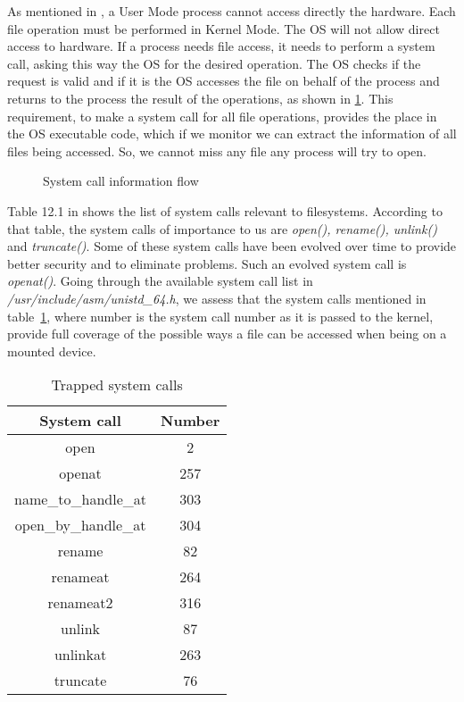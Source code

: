 \par As mentioned in \cite{linuxkernel}, a User Mode process cannot access directly the hardware. Each file operation must be performed in Kernel Mode. The \ac{OS} will not allow direct access to hardware. If a process needs file access, it needs to perform a system call, asking this way the \ac{OS} for the desired operation. The \ac{OS} checks if the request is valid and if it is the \ac{OS} accesses the file on behalf of the process and returns to the process the result of the operations, as shown in \ref{fig:syscall}. This requirement, to make a system call for all file operations, provides the place in the \ac{OS} executable code, which if we monitor we can extract the information of all files being accessed. So, we cannot miss any file any process will try to open.

\begin{figure}[ht]
	\centering
	
	\caption{System call information flow}
	\label{fig:syscall}
\end{figure}

\par Table 12.1 in \cite{linuxkernel} shows the list of system calls relevant to filesystems. According to that table, the system calls of importance to us are \emph{open(), rename(), unlink()} and \emph{truncate()}. Some of these system calls have been evolved over time to provide better security and to eliminate problems. Such an evolved system call is \emph{openat()}. Going through the available system call list in \emph{/usr/include/asm/unistd\_64.h}, we assess that the system calls mentioned in table~\ref{tbl:syscalls}, where number is the system call number as it is passed to the kernel, provide full coverage of the possible ways a file can be accessed when being on a mounted device. 

\begin{table}[h]
	\centering
	\caption{Trapped system calls}
	\label{tbl:syscalls}
	\begin{tabular}{cc}
		\toprule
		System call & Number \\
		\hline
		open & 2 \\ 
		openat & 257 \\ 
		name\_to\_handle\_at & 303 \\
		open\_by\_handle\_at & 304 \\
		rename & 82 \\ 
		renameat & 264 \\  
		renameat2 & 316 \\ 
		unlink & 87 \\ 
		unlinkat & 263 \\
		truncate & 76 \\
		\bottomrule
	\end{tabular}	
\end{table}



